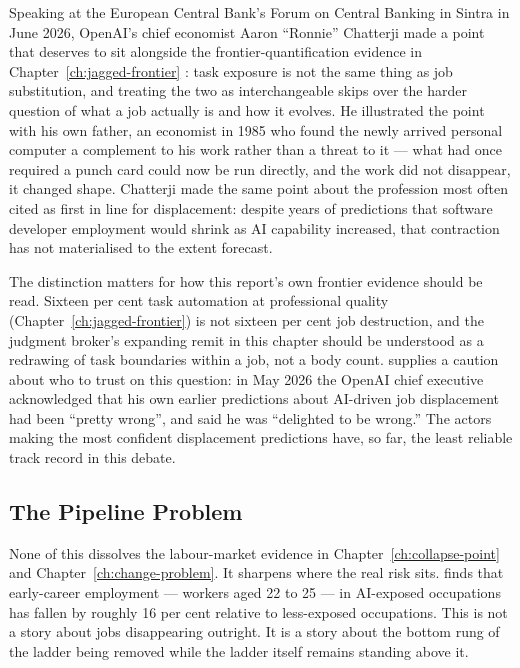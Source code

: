 Speaking at the European Central Bank's Forum on Central Banking in Sintra in June 2026, OpenAI's chief economist Aaron ``Ronnie'' Chatterji made a point that deserves to sit alongside the frontier-quantification evidence in Chapter~\ref{ch:jagged-frontier} \parencite{Chatterji2026}: task exposure is not the same thing as job substitution, and treating the two as interchangeable skips over the harder question of what a job actually is and how it evolves. He illustrated the point with his own father, an economist in 1985 who found the newly arrived personal computer a complement to his work rather than a threat to it --- what had once required a punch card could now be run directly, and the work did not disappear, it changed shape. Chatterji made the same point about the profession most often cited as first in line for displacement: despite years of predictions that software developer employment would shrink as AI capability increased, that contraction has not materialised to the extent forecast.

The distinction matters for how this report's own frontier evidence should be read. Sixteen per cent task automation at professional quality (Chapter~\ref{ch:jagged-frontier}) is not sixteen per cent job destruction, and the judgment broker's expanding remit in this chapter should be understood as a redrawing of task boundaries within a job, not a body count. \textcite{AltmanReversal2026} supplies a caution about who to trust on this question: in May 2026 the OpenAI chief executive acknowledged that his own earlier predictions about AI-driven job displacement had been ``pretty wrong'', and said he was ``delighted to be wrong.'' The actors making the most confident displacement predictions have, so far, the least reliable track record in this debate.

\subsection{The Pipeline Problem}

None of this dissolves the labour-market evidence in Chapter~\ref{ch:collapse-point} and Chapter~\ref{ch:change-problem}. It sharpens where the real risk sits. \textcite{Brynjolfsson2025Canaries} finds that early-career employment --- workers aged 22 to 25 --- in AI-exposed occupations has fallen by roughly 16 per cent relative to less-exposed occupations. This is not a story about jobs disappearing outright. It is a story about the bottom rung of the ladder being removed while the ladder itself remains standing above it.

